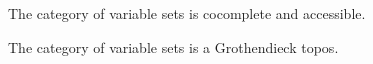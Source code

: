 \begin{proposition}
	The category of variable sets is cocomplete and accessible.
\end{proposition}

\begin{corollary}
	The category of variable sets is a Grothendieck topos.
\end{corollary}
